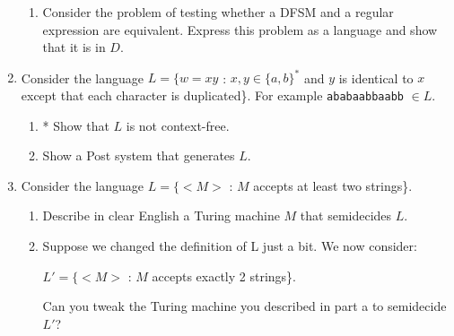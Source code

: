 \documentclass[10pt]{article}
\begin{document}
\begin{enumerate}[1)]
\begin{enumerate}
\item
Consider the problem of testing whether a DFSM and a regular expression are equivalent.  Express this problem as a language and show that it is in $D$.
\end{enumerate}



\item
Consider the language  $L = \{w = xy$ :  $x, y \in \{a, b\}^*$ and $y$ is identical to $x$ except that each character is 
duplicated\}.  For example \texttt{ababaabbaabb} $\in L$.
\begin{enumerate}
\item
* Show that $L$ is not context-free.

\item
Show a Post system that generates $L$.
\end{enumerate}



\item
Consider the language $L = \{<M>$ : $M$ accepts at least two strings\}.
\begin{enumerate}
\item
Describe in clear English a Turing machine $M$ that semidecides $L$.

\item
Suppose we changed the definition of L just a bit.  We now consider:
\begin{center}
$L' = \{<M>$ : $M$ accepts exactly 2 strings\}.
\end{center}
Can you tweak the Turing machine you described in part a to semidecide $L'$?
\end{enumerate}
\end{enumerate}
\end{document}
